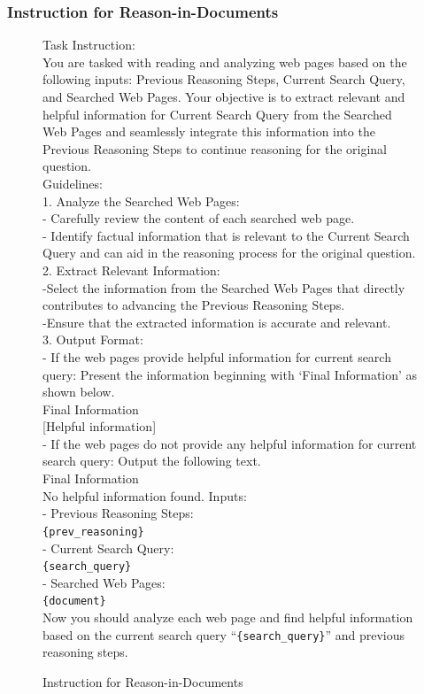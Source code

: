 \subsubsection{Instruction for Reason-in-Documents}
\begin{figure}[t]
\centering
\begin{tcolorbox}[mygreenbox, width=\textwidth, title={Instruction for Reason-in-Documents}, fonttitle=\Large\bfseries]
Task Instruction:\\
You are tasked with reading and analyzing web pages based on the following inputs: Previous Reasoning Steps, Current Search Query, and Searched Web Pages. Your objective is to extract relevant and helpful information for Current Search Query from the Searched Web Pages and seamlessly integrate this information into the Previous Reasoning Steps to continue reasoning for the original question.\\
Guidelines:\\
1. Analyze the Searched Web Pages:\\
- Carefully review the content of each searched web page.\\
- Identify factual information that is relevant to the Current Search Query and can aid in the reasoning process for the original question.\\
2. Extract Relevant Information:\\
-Select the information from the Searched Web Pages that directly contributes to advancing the Previous Reasoning Steps.\\
-Ensure that the extracted information is accurate and relevant.\\
3. Output Format:\\
- If the web pages provide helpful information for current search query: Present the information beginning with `Final Information' as shown below.\\
Final Information\\
{[Helpful information]}\\
- If the web pages do not provide any helpful information for current search query: Output the following text.\\
Final Information\\
No helpful information found.
Inputs:\\
- Previous Reasoning Steps: \\
\texttt{\{prev\_reasoning\}}\\
- Current Search Query: \\
\texttt{\{search\_query\}}\\
- Searched Web Pages: \\
\texttt{\{document\}}\\
Now you should analyze each web page and find helpful information based on the current search query ``\texttt{\{search\_query\}}'' and previous reasoning steps.
\end{tcolorbox}
\caption{Instruction for Reason-in-Documents}
\end{figure}

